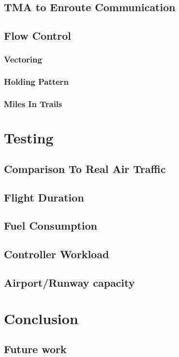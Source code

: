 \section{TMA to Enroute Communication}

\section{Flow Control}
\subsection{Vectoring}
\subsection{Holding Pattern}
\subsection{Miles In Trails}




\chapter{Testing}
\section{Comparison To Real Air Traffic}
\section{Flight Duration}
\section{Fuel Consumption}
\section{Controller Workload}
\section{Airport/Runway capacity}


\chapter{Conclusion}
\section{Future work}

